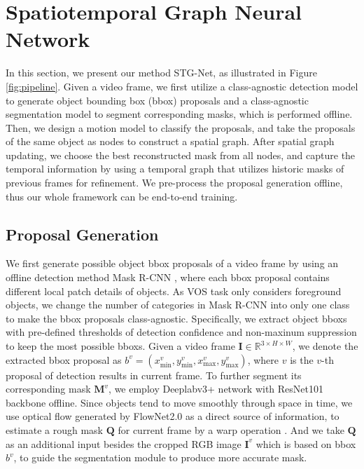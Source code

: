 \documentclass[letterpaper]{article} \usepackage{aaai21}  \usepackage{times}  \usepackage{helvet} \usepackage{courier}  \usepackage[hyphens]{url}  \usepackage{graphicx} \urlstyle{rm} \def\UrlFont{\rm}  \usepackage{graphicx}  \usepackage{natbib}  \usepackage{caption} \frenchspacing  \setlength{\pdfpagewidth}{8.5in}  \setlength{\pdfpageheight}{11in}  \usepackage{amsmath}
\begin{document}
\section{Spatiotemporal Graph Neural Network}
In this section, we present our method STG-Net, as illustrated in Figure \ref{fig:pipeline}. Given a video frame, we first utilize a class-agnostic detection model to generate object bounding box (bbox) proposals and a class-agnostic segmentation model to segment corresponding masks, which is performed offline. Then, we design a motion model to classify the proposals, and take the proposals of the same object as nodes to construct a spatial graph. After spatial graph updating, we choose the best reconstructed mask from all nodes, and capture the temporal information by using a temporal graph that utilizes historic masks of previous frames for refinement. We pre-process the proposal generation offline, thus our whole framework can be end-to-end training.

\subsection{Proposal Generation}
We first generate possible object bbox proposals of a video frame by using an offline detection method Mask R-CNN \cite{he2017mask}, where each bbox proposal contains different local patch details of objects. As VOS task only considers foreground objects, we change the number of categories in Mask R-CNN into only one class to make the bbox proposals class-agnostic. Specifically, we extract object bboxs with pre-defined thresholds of detection confidence and non-maxinum suppression to keep the most possible bboxs. Given a video frame $\bm{I} \in \mathbb{R}^{3 \times H\times W}$, we denote the extracted bbox proposal as $b^v = (x_{\text{min}}^v, y_{\text{min}}^v, x_{\text{max}}^v, y_{\text{max}}^v)$, where $v$ is the $v$-th proposal of detection results in current frame.
To further segment its corresponding mask $\bm{M}^v$, we employ Deeplabv3+ \cite{chen2018encoder} network with ResNet101 \cite{he2016deep} backbone offline. 
Since objects tend to move smoothly through space in time, we use optical flow generated by FlowNet2.0 \cite{ilg2017flownet} as a direct source of information, to estimate a rough mask $\bm{Q}$ for current frame by a warp operation \cite{khoreva2017lucid}. And we take $\bm{Q}$ as an additional input besides the cropped RGB image $\bm{I}^v$ which is based on bbox $b^v$, to guide the segmentation module to produce more accurate mask.
\end{document}
